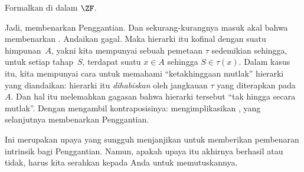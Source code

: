 \documentclass[../../../include/open-logic-section]{subfiles}
\begin{document}
\begin{prob}
	Formalkan \stagescofin{} di dalam $\ZF$.
\end{prob}

Jadi, \stagescofin{} membenarkan Penggantian. Dan sekurang-kurangnya masuk
akal bahwa \stagesinex{} membenarkan \stagescofin. Andaikan
\stagescofin{} gagal. Maka hierarki itu kofinal dengan suatu himpunan~$A$,
yakni kita mempunyai sebuah pemetaan $\tau$ sedemikian sehingga, untuk setiap
tahap~$S$, terdapat suatu $x \in A$ sehingga $S \in \tau(x)$. Dalam kasus
itu, kita mempunyai cara untuk memahami ``ketakhinggaan mutlak'' hierarki
yang diandaikan: hierarki itu \emph{dihabiskan} oleh jangkauan $\tau$ yang
diterapkan pada $A$. Dan hal itu melemahkan gagasan bahwa hierarki tersebut
``tak hingga secara mutlak''. Dengan mengambil kontraposisinya:
\stagesinex{} mengimplikasikan \stagescofin, yang selanjutnya membenarkan
Penggantian.

Ini merupakan upaya yang sungguh menjanjikan untuk memberikan pembenaran
intrinsik bagi Penggantian. Namun, apakah upaya itu akhirnya berhasil atau
tidak, harus kita serahkan kepada Anda untuk memutuskannya.
\end{document}
